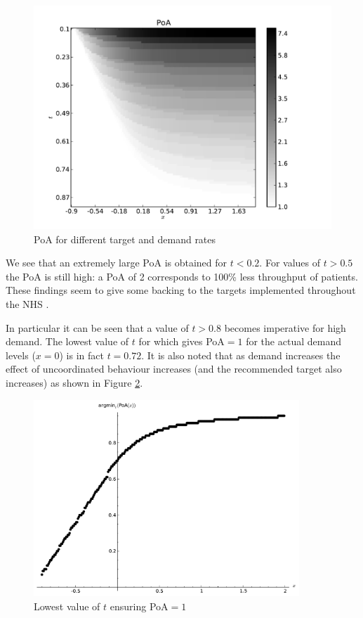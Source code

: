 \documentclass{article}
\begin{document}
\begin{figure}[!htbp]
\begin{center}
\includegraphics[width=.5\textwidth]{./Images/lnPoAmodel1targetvdemand.pdf}
\end{center}
\caption{PoA for different target and demand rates}\label{Fig:target_demand_model1}
\end{figure}

We see that an extremely large PoA is obtained for $t<0.2$.
For values of $t>0.5$ the PoA is still high: a PoA of 2 corresponds to 100\% less throughput of patients.
These findings seem to give some backing to the targets implemented throughout the NHS \cite{Bevan2006}.

In particular it can be seen that a value of $t>0.8$ becomes imperative for high demand.
The lowest value of $t$ for which gives PoA$=1$ for the actual demand levels ($x=0$) is in fact $t=0.72$.
It is also noted that as demand increases the effect of uncoordinated behaviour increases (and the recommended target also increases) as shown in Figure \ref{mintargetvdemand}.

\begin{figure}[!htbp]
\begin{center}
\includegraphics[width=10cm]{./Images/argminPoAmodel1.pdf}
\caption{Lowest value of $t$ ensuring PoA$=1$} \label{mintargetvdemand}
\end{center}
\end{figure}
\end{document}
